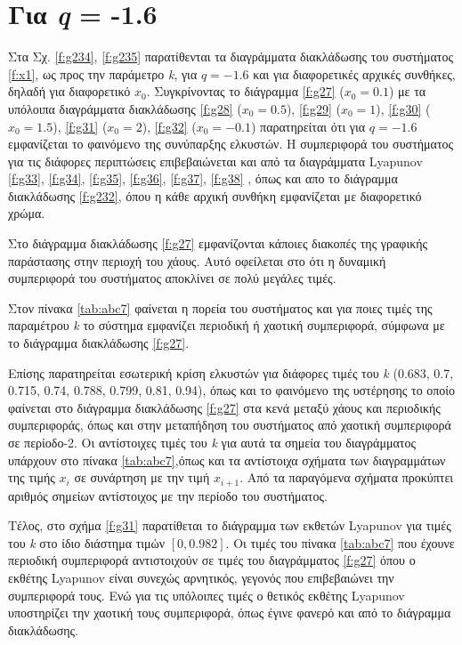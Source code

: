 \clearpage
\section{Για \emph{q} = -1.6}

Στα Σχ. \ref{f:g234}, \ref{f:g235}  παρατίθενται τα διαγράμματα διακλάδωσης του συστήματος \ref{f:x1}, ως προς την παράμετρο \emph{k}, για  $q =- 1.6$ και για διαφορετικές αρχικές συνθήκες, δηλαδή για διαφορετικό \(x_0\). Συγκρίνοντας το διάγραμμα \ref{f:g27} (\(x_0=0.1\)) με τα υπόλοιπα διαγράμματα διακλάδωσης \ref{f:g28}  (\(x_0=0.5\)), \ref{f:g29}  (\(x_0=1\)), \ref{f:g30}  (\(x_0=1.5\)), \ref{f:g31}  (\(x_0=2\)), \ref{f:g32}  (\(x_0=-0.1\)) παρατηρείται ότι για $q= -1.6$ εμφανίζεται το φαινόμενο της συνύπαρξης ελκυστών. Η συμπεριφορά του συστήματος για τις διάφορες περιπτώσεις επιβεβαιώνεται και από τα διαγράμματα Lyapunov \ref{f:g33}, \ref{f:g34}, \ref{f:g35}, \ref{f:g36}, \ref{f:g37}, \ref{f:g38} , όπως και απο το διάγραμμα διακλάδωσης \ref{f:g232}, όπου η κάθε αρχική συνθήκη εμφανίζεται με διαφορετικό χρώμα.

Στο διάγραμμα διακλάδωσης \ref{f:g27} εμφανίζονται κάποιες διακοπές της γραφικής παράστασης στην περιοχή του χάους. Αυτό οφείλεται στο ότι η δυναμική συμπεριφορά του συστήματος αποκλίνει σε πολύ μεγάλες τιμές.

Στον πίνακα \ref{tab:abc7} φαίνεται η πορεία του συστήματος και για ποιες τιμές της παραμέτρου  \emph{k} το σύστημα εμφανίζει περιοδική ή χαοτική συμπεριφορά, σύμφωνα με το διάγραμμα διακλάδωσης \ref{f:g27}.

Επίσης παρατηρείται εσωτερική κρίση ελκυστών για διάφορες τιμές του \emph{k} (0.683, 0.7, 0.715, 0.74, 0.788, 0.799, 0.81, 0.94), όπως και το φαινόμενο της υστέρησης το οποίο φαίνεται στο διάγραμμα διακλάδωσης \ref{f:g27} στα κενά μεταξύ χάους και περιοδικής συμπεριφοράς, όπως και στην μεταπήδηση του συστήματος από χαοτική συμπεριφορά σε περίοδο-2. Οι αντίστοιχες τιμές του \emph{k} για αυτά τα σημεία του διαγράμματος υπάρχουν στο πίνακα \ref{tab:abc7},όπως και τα αντίστοιχα σχήματα των διαγραμμάτων της τιμής \(x_i\) σε συνάρτηση με την τιμή \(x_{i+1}\). Από τα παραγόμενα σχήματα προκύπτει αριθμός σημείων αντίστοιχος με την περίοδο του συστήματος.

Τέλος, στο σχήμα \ref{f:g31} παρατίθεται το διάγραμμα των εκθετών Lyapunov για τιμές του \emph{k} στο ίδιο διάστημα τιμών $[0, 0.982]$. Οι τιμές του πίνακα \ref{tab:abc7} που έχουνε περιοδική συμπεριφορά αντιστοιχούν σε τιμές του διαγράμματος \ref{f:g27} όπου ο εκθέτης Lyapunov είναι συνεχώς αρνητικός, γεγονός που επιβεβαιώνει την συμπεριφορά τους. Ενώ για τις υπόλοιπες τιμές ο θετικός εκθέτης Lyapunov υποστηρίζει την χαοτική τους συμπεριφορά, όπως έγινε φανερό και από το διάγραμμα διακλάδωσης.\\\\


